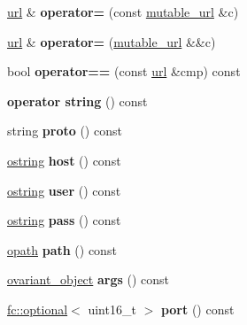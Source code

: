 \begin{DoxyCompactItemize}
\mbox{\hyperlink{classfc_1_1url}{url}} \& {\bfseries operator=} (const \mbox{\hyperlink{classfc_1_1mutable__url}{mutable\+\_\+url}} \&c)
\item 
\mbox{\label{classfc_1_1url_a89f7487aabb2bf5ca2e5cc60f44259a6}} 
\mbox{\hyperlink{classfc_1_1url}{url}} \& {\bfseries operator=} (\mbox{\hyperlink{classfc_1_1mutable__url}{mutable\+\_\+url}} \&\&c)
\item 
\mbox{\label{classfc_1_1url_af9b0c1ce36beb2844d32621649598951}} 
bool {\bfseries operator==} (const \mbox{\hyperlink{classfc_1_1url}{url}} \&cmp) const
\item 
\mbox{\label{classfc_1_1url_ae400aa57813f9192a421e32e02b0791e}} 
{\bfseries operator string} () const
\item 
\mbox{\label{classfc_1_1url_a5133c026182f0f10a9bf13ac81483565}} 
string {\bfseries proto} () const
\item 
\mbox{\label{classfc_1_1url_a195a2322d4ed37d3a6a8be6e5144473c}} 
\mbox{\hyperlink{classfc_1_1optional}{ostring}} {\bfseries host} () const
\item 
\mbox{\label{classfc_1_1url_ac1a5470dba235aeb41a1b248d0f83ca3}} 
\mbox{\hyperlink{classfc_1_1optional}{ostring}} {\bfseries user} () const
\item 
\mbox{\label{classfc_1_1url_afec5669397d1687d1677e84ff90874c1}} 
\mbox{\hyperlink{classfc_1_1optional}{ostring}} {\bfseries pass} () const
\item 
\mbox{\label{classfc_1_1url_a10ff9ce7fa8d6bfb6eec81652c4f0df9}} 
\mbox{\hyperlink{classfc_1_1optional}{opath}} {\bfseries path} () const
\item 
\mbox{\label{classfc_1_1url_aab56124d8e19579c35bda1e56d6811f6}} 
\mbox{\hyperlink{classfc_1_1optional}{ovariant\+\_\+object}} {\bfseries args} () const
\item 
\mbox{\label{classfc_1_1url_a37a9cd8ad9991e2905ed7fb2cd9f50a4}} 
\mbox{\hyperlink{classfc_1_1optional}{fc\+::optional}}$<$ uint16\+\_\+t $>$ {\bfseries port} () const
\end{DoxyCompactItemize}
